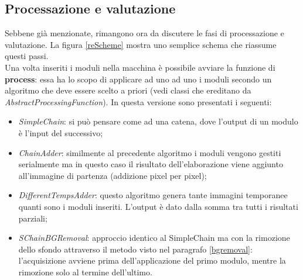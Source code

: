 \documentclass[a4paper,10pt, twocolumn]{article}
\begin{document}
 \subsection{Processazione e valutazione}
 Sebbene gi\`{a} menzionate, rimangono ora da discutere le fasi di processazione e valutazione.
 La figura \ref{reScheme} mostra uno semplice schema che riassume questi passi.\\
 Una volta inseriti i moduli nella macchina \`{e} possibile avviare la funzione di 
 \textbf{process}: essa ha lo scopo di applicare ad uno ad uno i moduli secondo un algoritmo 
 che deve essere scelto a priori (vedi classi che ereditano da
  \textit{AbstractProcessingFunction}). 
  In questa versione sono presentati i seguenti:
 \begin{itemize}
  \item \textit{SimpleChain}: si pu\`{o} pensare come ad una catena, dove l'output 
  di un modulo \`{e} l'input del successivo;
  \item \textit{ChainAdder}: similmente al precedente algoritmo i moduli vengono gestiti
  serialmente ma in questo caso il risultato dell'elaborazione viene aggiunto all'immagine
  di partenza (addizione pixel per pixel);
  \item \textit{DifferentTempsAdder}: questo algoritmo genera tante immagini temporanee 
  quanti sono i moduli inseriti. L'output \`{e} dato dalla somma tra tutti i risultati
  parziali;
  \item \textit{SChainBGRemoval}: approccio identico al SimpleChain ma con la rimozione 
  dello sfondo attraverso il metodo visto nel paragrafo \ref{bgremoval}:
  l'acquisizione avviene prima dell'applicazione del primo modulo, mentre la rimozione
  solo al termine dell'ultimo.
 \end{itemize}
\end{document}
